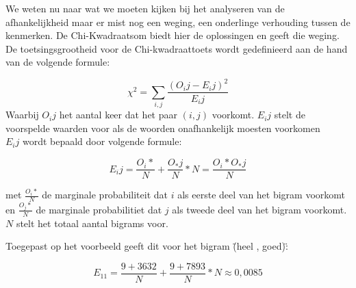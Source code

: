 %
%
We weten nu naar wat we moeten kijken bij het analyseren van de afhankelijkheid maar er mist nog een weging, een onderlinge verhouding tussen de kenmerken. 
%
De Chi-Kwadraatsom biedt hier de oplossingen en geeft die weging. De toetsingsgrootheid voor de Chi-kwadraattoets wordt gedefinieerd aan de hand van de volgende formule:

\[{\chi}^2=\sum_{i,j}^{} \frac{(O_ij - E_ij)^2}{E_ij}\]
%
Waarbij ${O_ij}$ het aantal keer dat het paar $(i,j)$ voorkomt. $E_ij$ stelt de voorspelde waarden voor als de woorden onafhankelijk moesten voorkomen\\
$E_ij$ wordt bepaald door volgende formule:

\[{E_ij}= \frac{O_i*}{N} + \frac{O_*j}{N} * N = \frac{O_i* O_*j}{N} \]

met $\frac{O_i*}{N}$ de marginale probabiliteit dat $i$ als eerste deel van het bigram voorkomt en $\frac{O_j*}{N}$ de marginale probabilitiet dat $j$ als tweede deel van het bigram voorkomt. $N$ stelt het totaal aantal bigrams voor.

Toegepast op het voorbeeld geeft dit voor het bigram \"(heel , goed)\":

\[{E_11} = \frac{9+3632}{N}+\frac{9+7893}{N} * N ≈ 0,0085 \]


